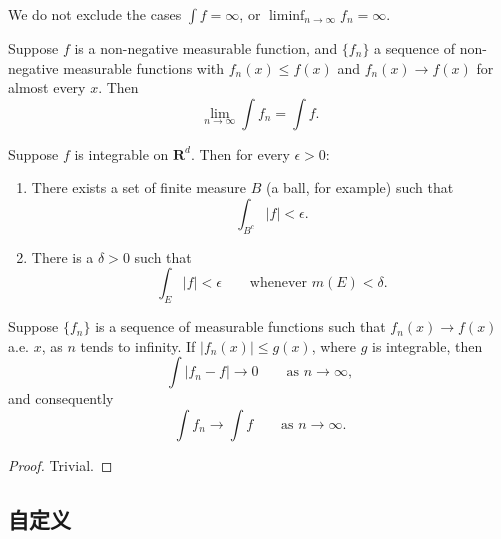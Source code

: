 \begin{remark}
	We do not exclude the cases $\int f = \infty$,
	or $\liminf_{n \to \infty} f_n = \infty$.
\end{remark}

\begin{corollary}
	Suppose $f$ is a non-negative measurable function, and $\{f_n\}$ a sequence
	of non-negative measurable functions with
	$f_n(x) \leq f(x)$ and $f_n(x) \to f(x)$ for almost every $x$. Then
	\begin{equation}
	\lim_{n \to \infty} \int f_n = \int f.
	\end{equation}
\end{corollary}

\begin{proposition}
	Suppose $f$ is integrable on $\mathbf{R}^d$. Then for every $\epsilon > 0$:
	\begin{enumerate}
		\renewcommand{\theenumi}{\roman{enumi}}
		\item There exists a set of finite measure $B$ (a ball, for example) such that
		\begin{equation}
		\int_{B^c} |f| < \epsilon.
		\end{equation}
		\item There is a $\delta > 0$ such that
		\begin{equation}
		\int_E |f| < \epsilon \qquad \text{whenever } m(E) < \delta.
		\end{equation}
	\end{enumerate}
\end{proposition}

\begin{theorem}
	Suppose $\{f_n\}$ is a sequence of measurable functions such that
	$f_n(x) \to f(x)$ a.e. $x$, as $n$ tends to infinity.
	If $|f_n(x)| \leq g(x)$, where $g$ is integrable, then
	\begin{equation}
	\int |f_n - f| \to 0 \qquad \text{as } n \to \infty,
	\end{equation}
	and consequently
	\begin{equation}
	\int f_n \to \int f \qquad \text{as } n \to \infty.
	\end{equation}
\end{theorem}

\begin{proof}
	Trivial.
\end{proof}

\subsection{自定义}

